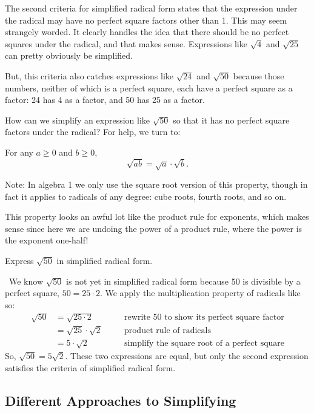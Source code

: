 The second criteria for simplified radical form states that the expression under the radical may have no perfect square factors other than 1. This may seem strangely worded. It clearly handles the idea that there should be no perfect squares under the radical, and that makes sense. Expressions like $\sqrt{4}$ and $\sqrt{25}$ can pretty obviously be simplified.

But, this criteria also catches expressions like $\sqrt{24}$ and $\sqrt{50}$ because those numbers, neither of which is a perfect square, each have a perfect square as a factor: 24 has 4 as a factor, and 50 has 25 as a factor.

How can we simplify an expression like $\sqrt{50}$ so that it has no perfect square factors under the radical? For help, we turn to:

\begin{boxeddef}
For any $a \geq 0$ and $b \geq 0$, \[\sqrt{ab} = \sqrt{a} \cdot \sqrt{b}.\]

Note: In algebra 1 we only use the square root version of this property, though in fact it applies to radicals of any degree: cube roots, fourth roots, and so on.
\end{boxeddef}

This property looks an awful lot like the product rule for exponents, which makes sense since here we are undoing the power of a product rule, where the power is the exponent one-half!

\begin{boxedex}
Express $\sqrt{50}$ in simplified radical form.

\exsoln\ We know $\sqrt{50}$ is not yet in simplified radical form because 50 is divisible by a perfect square, $50 = 25 \cdot 2$. We apply the multiplication property of radicals like so:
\[
\begin{aligned}
\sqrt{50} 	&= \sqrt{25 \cdot 2}
&& \quad \text{rewrite 50 to show its perfect square factor}\\
			&= \sqrt{25} \cdot \sqrt{2}
&& \quad \text{product rule of radicals}\\
			&= 5 \cdot \sqrt{2}
&& \quad \text{simplify the square root of a perfect square}
\end{aligned}
\]
So, $\sqrt{50} = 5\sqrt{2}$. These two expressions are equal, but only the second expression satisfies the criteria of simplified radical form.
\end{boxedex}

\subsection{Different Approaches to Simplifying}


